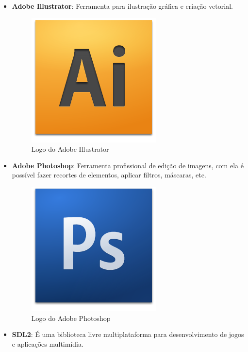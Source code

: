 \documentclass[11pt]{article} %
\begin{document}
\begin{itemize}
\item \textbf{Adobe Illustrator}: Ferramenta para ilustração gráfica e criação vetorial.

\begin{figure}[!htp]
\centering
\includegraphics[scale=0.3]{pictures/adobe_illustrator.png}
\caption{Logo do Adobe Illustrator}
\label{Adobe Illustrator}
\end{figure}

\item \textbf{Adobe Photoshop}: Ferramenta profissional de edição de imagens, com ela é possível fazer recortes de elementos, aplicar filtros, máscaras, etc.

\newpage

\begin{figure}[!htp]
\centering
\includegraphics[scale=0.3]{pictures/Photoshop.png}
\caption{Logo do Adobe Photoshop}
\label{Adobe Photoshop}
\end{figure}

\item \textbf{SDL2}: É uma biblioteca livre multiplataforma para desenvolvimento de jogos e aplicações multimídia.


\end{itemize}
\end{document}
